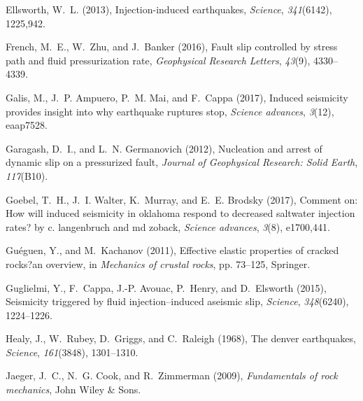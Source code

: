 \documentclass[grl]{agutex2arxiv}
\begin{document}
\begin{article}
\begin{thebibliography}{44}
Ellsworth, W.~L. (2013), Injection-induced earthquakes, \textit{Science},
  \textit{341}(6142), 1225,942.

French, M.~E., W.~Zhu, and J.~Banker (2016), Fault slip controlled by stress
  path and fluid pressurization rate, \textit{Geophysical Research Letters},
  \textit{43}(9), 4330--4339.

Galis, M., J.~P. Ampuero, P.~M. Mai, and F.~Cappa (2017), Induced seismicity
  provides insight into why earthquake ruptures stop, \textit{Science
  advances}, \textit{3}(12), eaap7528.

Garagash, D.~I., and L.~N. Germanovich (2012), Nucleation and arrest of dynamic
  slip on a pressurized fault, \textit{Journal of Geophysical Research: Solid
  Earth}, \textit{117}(B10).

Goebel, T.~H., J.~I. Walter, K.~Murray, and E.~E. Brodsky (2017), Comment on:
  How will induced seismicity in oklahoma respond to decreased saltwater
  injection rates? by c. langenbruch and md zoback, \textit{Science advances},
  \textit{3}(8), e1700,441.

Gu{\'e}guen, Y., and M.~Kachanov (2011), Effective elastic properties of
  cracked rocks?an overview, in \textit{Mechanics of crustal rocks}, pp.
  73--125, Springer.

Guglielmi, Y., F.~Cappa, J.-P. Avouac, P.~Henry, and D.~Elsworth (2015),
  Seismicity triggered by fluid injection--induced aseismic slip,
  \textit{Science}, \textit{348}(6240), 1224--1226.

Healy, J., W.~Rubey, D.~Griggs, and C.~Raleigh (1968), The denver earthquakes,
  \textit{Science}, \textit{161}(3848), 1301--1310.

Jaeger, J.~C., N.~G. Cook, and R.~Zimmerman (2009), \textit{Fundamentals of
  rock mechanics}, John Wiley \& Sons.


\end{thebibliography}
\end{article}
\end{document}
